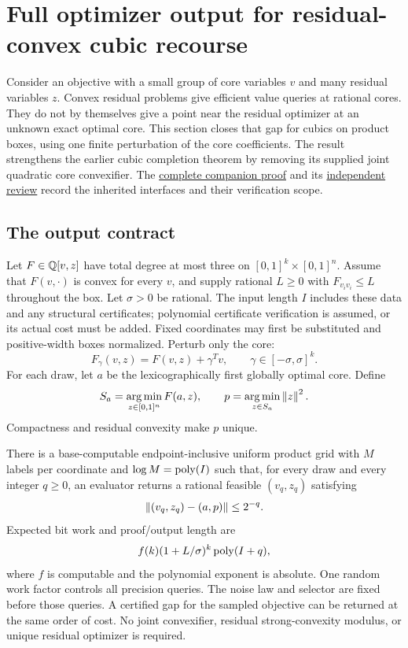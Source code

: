 \section{Full optimizer output for residual-convex cubic recourse}
\label{sec:recourse}

Consider an objective with a small group of core variables $v$ and many
residual variables $z$. Convex residual problems give efficient value
queries at rational cores. They do not by themselves give a point near
the residual optimizer at an unknown exact optimal core. This section
closes that gap for cubics on product boxes, using one finite perturbation
of the core coefficients. The result strengthens the earlier cubic
completion theorem by removing its supplied joint quadratic core
convexifier. The
\href{../cubic-recourse/theorem.md}{complete companion proof} and its
\href{../reviews/cubic-extension/review.md}{independent review}
record the inherited interfaces and their verification scope.

\subsection{The output contract}

Let $F\in\mathbb Q[v,z]$ have total degree at most three on
$[0,1]^k\times[0,1]^n$. Assume that $F(v,\cdot)$ is convex for every
$v$, and supply rational $L\ge0$ with $F_{v_iv_i}\le L$ throughout
the box. Let $\sigma>0$ be rational. The input length $I$ includes
these data and any structural certificates; polynomial certificate
verification is assumed, or its actual cost must be added. Fixed
coordinates may first be substituted and positive-width boxes
normalized. Perturb only the core:
\[
 F_\gamma(v,z)=F(v,z)+\gamma^Tv,
 \qquad \gamma\in[-\sigma,\sigma]^k.
\]
For each draw, let $a$ be the lexicographically first globally optimal
core. Define
\[
 S_a=\operatorname*{arg\,min}_{z\in[0,1]^n}F(a,z),
 \qquad p=\operatorname*{arg\,min}_{z\in S_a}\left\lVert z\right\rVert^2.
\]
Compactness and residual convexity make $p$ unique.

\begin{theorem}
\label{thm:cubic-recourse}
There is a base-computable endpoint-inclusive uniform product grid with
$M$ labels per coordinate and $\log M=\operatorname{poly}(I)$ such that, for every
draw and every integer $q\ge0$, an evaluator returns a rational feasible
$(v_q,z_q)$ satisfying
\[
 \left\lVert(v_q,z_q)-(a,p)\right\rVert\le2^{-q}.
\]
Expected bit work and proof/output length are
\begin{equation}
 f(k)(1+L/\sigma)^k\operatorname{poly}(I+q),
 \label{eq:recourse-work}
\end{equation}
where $f$ is computable and the polynomial exponent is absolute.
One random work factor controls all precision queries. The noise law
and selector are fixed before those queries. A certified gap for the
sampled objective can be returned at the same order of cost.
No joint convexifier, residual strong-convexity modulus, or unique
residual optimizer is required.
\end{theorem}

